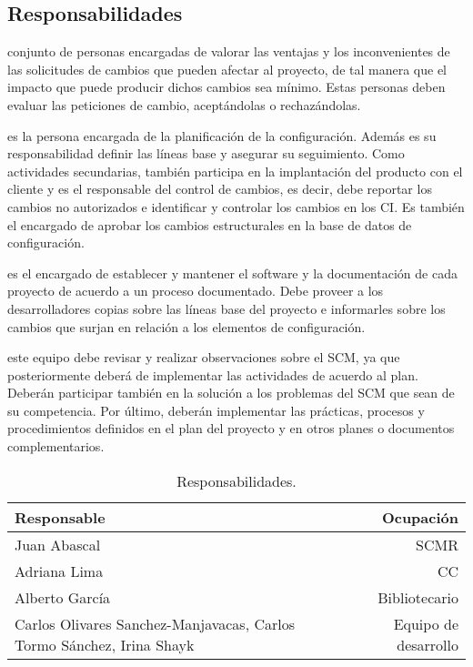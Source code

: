 \subsection{Responsabilidades}
\begin{description}[style=multiline, leftmargin=4cm]
  \item[Comité de control de cambios:] conjunto de personas encargadas de valorar las ventajas y los inconvenientes de las solicitudes de cambios que pueden afectar al proyecto, de tal manera que el impacto que puede producir dichos cambios sea mínimo.  Estas personas deben evaluar las peticiones de cambio, aceptándolas o rechazándolas.
  \item[Responsable de GC:] es la persona encargada de la planificación de la configuración. Además es su responsabilidad definir las líneas base y asegurar su seguimiento. Como actividades secundarias, también participa en la implantación del producto con el cliente y es el responsable del control de cambios, es decir, debe reportar los cambios no autorizados e identificar y controlar los cambios en los CI. Es también el encargado de aprobar los cambios estructurales en la base de datos de configuración.
  \item[Bibliotecario:] es el encargado de establecer y mantener el software y la documentación de cada proyecto de acuerdo a un proceso documentado. Debe proveer a los desarrolladores copias sobre las líneas base del proyecto e informarles sobre los cambios que surjan en relación a los elementos de configuración.
  \item[Resto personal desarrollador:] este equipo debe revisar y realizar observaciones sobre el SCM, ya que posteriormente deberá de implementar las actividades de acuerdo al plan. Deberán participar también en la solución a los problemas del SCM que sean de su competencia. Por último, deberán implementar las prácticas, procesos y procedimientos definidos en el plan del proyecto y en otros planes o documentos complementarios.
\end{description}

\begin{table}[h]
\begin{center}
\begin{tabular}{ p{5cm} | r }
\hline
	\textbf{Responsable} & \textbf{Ocupación} \\ \hline \hline
  Juan Abascal & SCMR \\
  Adriana Lima & CC \\
  Alberto García & Bibliotecario \\
  Carlos Olivares Sanchez-Manjavacas, Carlos Tormo Sánchez, Irina Shayk & Equipo de desarrollo \\ \hline
\end{tabular}
\caption{Responsabilidades.}
\label{tab:Responsabilidades}
\end{center}
\end{table}

